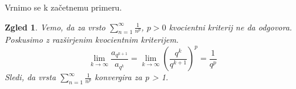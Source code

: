 \documentclass{beamer}
\newtheorem{zgled}{Zgled}
\begin{document}
\begin{frame}
    Vrnimo se k začetnemu primeru.
    \begin{zgled}
        Vemo, da za vrsto 
        $\sum_{n = 1}^{\infty}{\frac{1}{n^p}}$, $p > 0$
        kvocientni kriterij ne da odgovora.
        Poskusimo z razširjenim kvocientnim kriterijem.
        \pause
        \[
            \lim_{k \to \infty}{\frac{a_{q^{k + 1}}}{a_{q^k}}} =
            \lim_{k \to \infty}{\left( \frac{q^k}{q^{k+1}} \right)^p} = \frac{1}{q^p}
        \]
        \vspace{0.2cm}
        \pause
        Sledi, da vrsta $\sum_{n = 1}^{\infty}{\frac{1}{n^p}}$ konvergira za p > 1.

    \end{zgled}
    
\end{frame}

\end{document}
